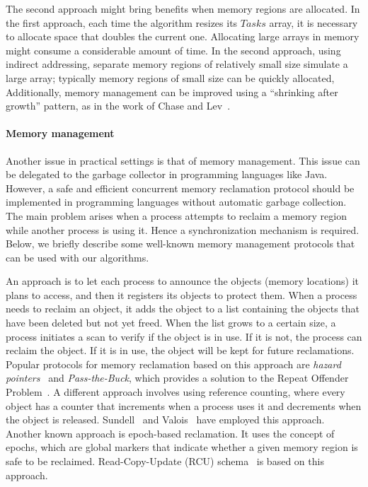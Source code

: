 The second approach might bring benefits when memory regions are allocated. In the first approach, each time the algorithm resizes its \(Tasks\) array, it is necessary to allocate space that doubles the current one. {Allocating large arrays in memory might consume a considerable amount of time.} In the second approach, using indirect addressing, separate memory regions of relatively small size simulate a large array; typically memory regions of small size can be quickly allocated, Additionally, memory management can be improved using a ``shrinking after growth'' pattern, as in the work of Chase and Lev~\cite{circular.work.stealing}.


\paragraph*{Memory management}

Another issue in practical settings is that of memory management. This issue can be delegated to the garbage collector in programming languages like Java. However, a safe and efficient concurrent memory reclamation protocol should be implemented in programming languages without automatic garbage collection. The main problem arises when a process attempts to reclaim a memory region while another process is using it. Hence a synchronization mechanism is required. Below, we briefly describe some well-known memory management protocols that can be used with our algorithms.

An approach is to let each process to announce the objects (memory locations) it plans to access, and then it registers its objects to protect them. When a process needs to reclaim an object, it adds the object to a list containing the objects that have been deleted but not yet freed. When the list grows to a certain size, a process initiates a scan to verify if the object is in use.  If it is not, the process can reclaim the object. If it is in use, the object will be kept for future reclamations. Popular protocols for memory reclamation based on this approach are \textit{hazard pointers}~\cite{DBLP_journals_tpds_Michael04} and \emph{Pass-the-Buck}, which provides a solution to the Repeat Offender Problem~\cite{DBLP_conf_wdag_HerlihyLM02}. A different approach involves using reference counting, where every object has a counter that increments when a process uses it and decrements when the object is released. Sundell~\cite{DBLP_conf_ipps_Sundell05} and Valois~\cite{DBLP_conf_podc_Valois95} have employed this approach. Another known approach is epoch-based reclamation. It uses the concept of epochs, which are global markers that indicate whether a given memory region is safe to be reclaimed. Read-Copy-Update (RCU) schema~\cite{mckenney2001read} is based on this approach.

